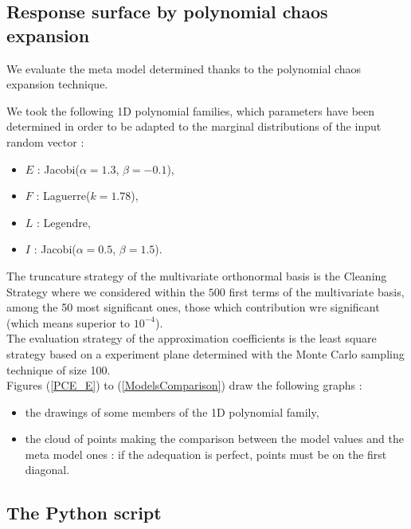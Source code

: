 \documentclass[11pt]{article}
\begin{document}
\subsection{Response surface by polynomial chaos expansion}


We evaluate the meta model determined thanks to the polynomial chaos expansion technique.




We took the following 1D polynomial families, which parameters have been determined in order to be adapted to the marginal distributions of the input random vector :
\begin{itemize}
\item $E$ : Jacobi($\alpha = 1.3$, $\beta = -0.1$),
\item $F$ : Laguerre($k = 1.78$),
\item $L$ : Legendre,
\item $I$ : Jacobi($\alpha = 0.5$, $\beta = 1.5$).
\end{itemize}

The truncature strategy of the multivariate orthonormal basis is the Cleaning Strategy where we considered within the $500$ first terms of the multivariate basis, among the 50 most significant ones, those which contribution wre significant (which means superior to $10^{-4}$).\\

The evaluation strategy of the approximation coefficients is the least square strategy based on a experiment plane determined with the Monte Carlo sampling technique of size 100.\\

Figures (\ref{PCE_E}) to (\ref{ModelsComparison}) draw the following graphs :
\begin{itemize}
\item the drawings of some members of the 1D polynomial family,
\item the cloud of points making the comparison between the model values and the meta model ones : if the adequation is perfect, points must be on the first diagonal.
\end{itemize}















\subsection{The Python script}
\end{document}
